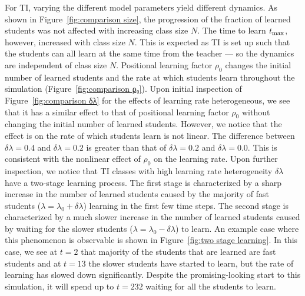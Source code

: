 \documentclass[twocolumn,secnumarabic,amssymb, nobibnotes, aps, prd]{revtex4-2}
\begin{document}
        For TI, varying the different model parameters yield different dynamics.
        As shown in Figure~\ref{fig:comparison size}, the progression of the fraction of learned students was not affected with increasing class size $N$.
        The time to learn $t_{\rm max}$, however, increased with class size $N$.
        This is expected as TI is set up such that the students can all learn at the same time from the teacher --- so the dynamics are independent of class size $N$.
        Positional learning factor $\rho_0$ changes the initial number of learned students and the rate at which students learn throughout the simulation (Figure~\ref{fig:comparison ρ₀}).
        Upon initial inspection of Figure~\ref{fig:comparison δλ} for the effects of learning rate heterogeneous, we see that it has a similar effect to that of positional learning factor $\rho_0$ without changing the initial number of learned students.
        However, we notice that the effect is on the rate of which students learn is not linear.
        The difference between $\delta\lambda=0.4$ and $\delta\lambda=0.2$ is greater than that of $\delta\lambda=0.2$ and $\delta\lambda=0.0$.
        This is consistent with the nonlinear effect of $\rho_0$ on the learning rate.
        Upon further inspection, we notice that TI classes with high learning rate heterogeneity $\delta\lambda$ have a two-stage learning process.
        The first stage is characterized by a sharp increase in the number of learned students caused by the majority of fast students ($\lambda=\lambda_0 + \delta\lambda$) learning in the first few time steps.
        The second stage is characterized by a much slower increase in the number of learned students caused by waiting for the slower students ($\lambda=\lambda_0 - \delta\lambda$) to learn.
        An example case where this phenomenon is observable is shown in Figure~\ref{fig:two stage learning}.
        In this case, we see at $t=2$ that majority of the students that are learned are fast students and at $t=13$ the slower students have started to learn, but the rate of learning has slowed down significantly.
        Despite the promising-looking start to this simulation, it will spend up to $t=232$ waiting for all the students to learn.

\end{document}
